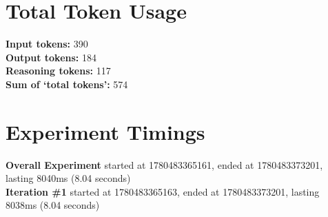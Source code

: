 \documentclass{article}
\begin{document}
\section*{Total Token Usage}
\textbf{Input tokens: }390
\\\textbf{Output tokens: }184
\\\textbf{Reasoning tokens: }117
\\\textbf{Sum of `total tokens': }574
\section*{Experiment Timings}
\textbf{Overall Experiment} started at 1780483365161, ended at 1780483373201, lasting 8040ms (8.04 seconds)
\\\textbf{Iteration \#1} started at 1780483365163, ended at 1780483373201, lasting 8038ms (8.04 seconds)
\end{document}

